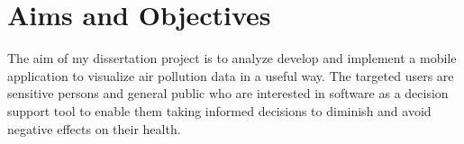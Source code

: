 \section{Aims and Objectives}
The aim of my dissertation project is to analyze develop and implement a mobile application to visualize air pollution data in a useful way. The targeted users are sensitive persons and general public who are interested in software as a decision support tool to enable them taking informed decisions to diminish and avoid negative effects on their health.